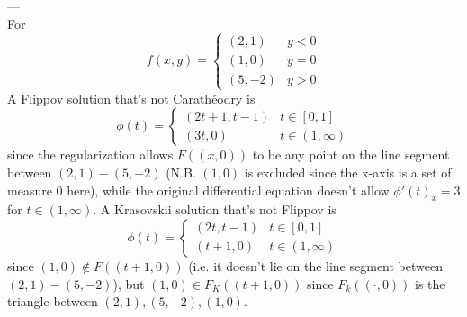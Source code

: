 \documentclass{article}
\newenvironment{ex}[1]
  {\renewcommand\theexercise{#1}\exercise}
  {\endexercise}
\newcommand{\cara}{Carath\'eodry\xspace}
\newcommand{\kras}{Krasovskii\xspace}
\newcommand{\flip}{Flippov\xspace}
\begin{document}
\begin{ex}{1.10}
  ---
  \,\\
  For
  $$
  f(x, y) = \begin{cases}
    (2, 1) & y < 0 \\
    (1, 0) & y = 0 \\
    (5, -2) & y > 0
  \end{cases}
  $$
  A \flip solution that's not \cara is
  $$
  \phi(t) = \begin{cases}
    (2t + 1, t -1) & t \in [0, 1] \\
    (3t, 0) & t \in (1, \infty)
  \end{cases}
  $$
  since the regularization allows $F((x, 0))$ to be any point on the line segment between $(2, 1) - (5, -2)$ (N.B. $(1, 0)$ is excluded since the x-axis is a set of measure $0$ here), while the original differential equation doesn't allow $\phi'(t)_x = 3$ for $t \in (1, \infty)$. A \kras solution that's not \flip is
  $$
  \phi(t) = \begin{cases}
    (2t, t-1) & t \in [0, 1] \\
    (t + 1, 0) & t \in (1, \infty)
  \end{cases}
  $$
  since $(1, 0) \not\in F((t+1, 0))$ (i.e. it doesn't lie on the line segment between $(2, 1) - (5, -2)$), but $(1, 0) \in F_K((t + 1, 0))$ since $F_k((\cdot, 0))$ is the triangle between $(2, 1), (5, -2), (1, 0)$.
\end{ex}
\end{document}
